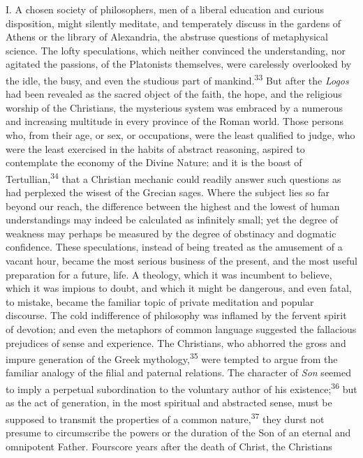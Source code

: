 I. A chosen society of philosophers, men of a liberal education
and curious disposition, might silently meditate, and temperately
discuss in the gardens of Athens or the library of Alexandria,
the abstruse questions of metaphysical science. The lofty
speculations, which neither convinced the understanding, nor
agitated the passions, of the Platonists themselves, were
carelessly overlooked by the idle, the busy, and even the
studious part of mankind.\textsuperscript{33} But after the \textit{Logos} had been
revealed as the sacred object of the faith, the hope, and the
religious worship of the Christians, the mysterious system was
embraced by a numerous and increasing multitude in every province
of the Roman world. Those persons who, from their age, or sex, or
occupations, were the least qualified to judge, who were the
least exercised in the habits of abstract reasoning, aspired to
contemplate the economy of the Divine Nature: and it is the boast
of Tertullian,\textsuperscript{34} that a Christian mechanic could readily answer
such questions as had perplexed the wisest of the Grecian sages.
Where the subject lies so far beyond our reach, the difference
between the highest and the lowest of human understandings may
indeed be calculated as infinitely small; yet the degree of
weakness may perhaps be measured by the degree of obstinacy and
dogmatic confidence. These speculations, instead of being treated
as the amusement of a vacant hour, became the most serious
business of the present, and the most useful preparation for a
future, life. A theology, which it was incumbent to believe,
which it was impious to doubt, and which it might be dangerous,
and even fatal, to mistake, became the familiar topic of private
meditation and popular discourse. The cold indifference of
philosophy was inflamed by the fervent spirit of devotion; and
even the metaphors of common language suggested the fallacious
prejudices of sense and experience. The Christians, who abhorred
the gross and impure generation of the Greek mythology,\textsuperscript{35} were
tempted to argue from the familiar analogy of the filial and
paternal relations. The character of \textit{Son} seemed to imply a
perpetual subordination to the voluntary author of his existence;\textsuperscript{36}
but as the act of generation, in the most spiritual and
abstracted sense, must be supposed to transmit the properties of
a common nature,\textsuperscript{37} they durst not presume to circumscribe the
powers or the duration of the Son of an eternal and omnipotent
Father. Fourscore years after the death of Christ, the Christians
